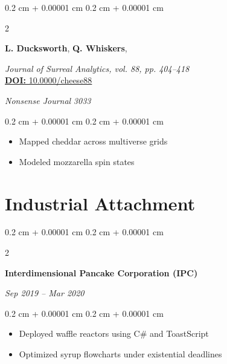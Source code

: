 \documentclass[10pt, letterpaper]{article}
\newenvironment{highlights}{
    \begin{itemize}[
        topsep=0.10 cm,
        parsep=0.10 cm,
        partopsep=0pt,
        itemsep=0pt,
        leftmargin=0.4 cm + 10pt
    ]
}{
    \end{itemize}
}
\newenvironment{onecolentry}{
    \begin{adjustwidth}{
        0.2 cm + 0.00001 cm
    }{
        0.2 cm + 0.00001 cm
    }
}{
    \end{adjustwidth}
}
\newenvironment{twocolentry}[2][]{
    \onecolentry
    \def\secondColumn{#2}
    \setcolumnwidth{\fill, 4.5 cm}
    \begin{paracol}{2}
}{
    \switchcolumn \raggedleft \secondColumn
    \end{paracol}
    \endonecolentry
}
\let\hrefWithoutArrow\href
\renewcommand{\href}[2]{\hrefWithoutArrow{#1}{\ifthenelse{\equal{#2}{}}{ }{#2 }\raisebox{.15ex}{\footnotesize \faExternalLink*}}}
\begin{document}
    \vspace{0.2 cm}
    
    \begin{twocolentry}{
        \textit{Nonsense Journal}    
        \textit{3033}}
        \textbf{L. Ducksworth}, \textbf{Q. Whiskers}, 
    
        \footnotesize\textit{Journal of Surreal Analytics, vol. 88, pp. 404--418} \\
        \hrefWithoutArrow{http://dx.doi.org/10.0000/cheese88}{\scriptsize \color{black} \textbf{DOI:} 10.0000/cheese88}
    \end{twocolentry}
    
    \vspace{0.10 cm}
    
    \begin{onecolentry}
        \begin{highlights}
            \item Mapped cheddar across multiverse grids
            \item Modeled mozzarella spin states
        \end{highlights}
    \end{onecolentry}
    
    \vspace{0.05 cm}

    \section{Industrial Attachment}
    
    \begin{twocolentry}{
        \textit{Sep 2019 – Mar 2020}}
        \textbf{Interdimensional Pancake Corporation (IPC)}
    \end{twocolentry}
    
    \vspace{0.10 cm}
    
    \begin{onecolentry}
        \begin{highlights}
            \item \text Deployed waffle reactors using C\# and ToastScript
            \item \text Optimized syrup flowcharts under existential deadlines
        \end{highlights}
    \end{onecolentry}
    
    \vspace{0.05 cm}
    
\end{document}
